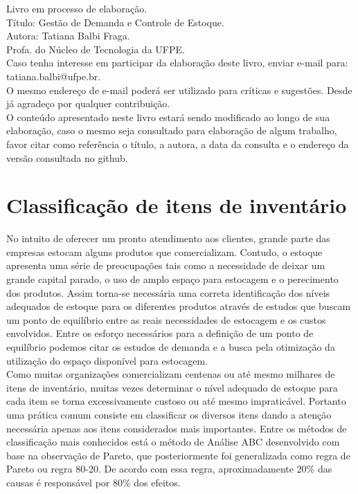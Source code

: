 \documentclass{book}
\begin{document}
Livro em processo de elaboração. \\

Título: Gestão de Demanda e Controle de Estoque.\\

Autora: Tatiana Balbi Fraga. \\

Profa. do Núcleo de Tecnologia da UFPE. \\

Caso tenha interesse em participar da elaboração deste livro, enviar e-mail para: tatiana.balbi@ufpe.br.\\

O mesmo endereço de e-mail poderá ser utilizado para críticas e sugestões. Desde já agradeço por qualquer contribuição. \\

O conteúdo apresentado neste livro estará sendo modificado ao longo de sua elaboração, caso o mesmo seja consultado para elaboração de algum trabalho, favor citar como referência o título, a autora, a data da consulta e o endereço da versão consultada no github. \\

\chapter{Classificação de itens de inventário}

No intuito de oferecer um pronto atendimento aos clientes, grande parte das empresas estocam alguns produtos que comercializam. Contudo, o estoque apresenta uma série de preocupações tais como a necessidade de deixar um grande capital parado, o uso de amplo espaço para estocagem e o perecimento dos produtos. Assim torna-se necessária uma correta identificação dos níveis adequados de estoque para os diferentes produtos através de estudos que buscam um ponto de equilíbrio entre as reais necessidades de estocagem e os custos envolvidos. Entre os esforço necessários para a definição de um ponto de equilíbrio podemos citar os estudos de demanda e a busca pela otimização da utilização do espaço disponível para estocagem. \\

Como muitas organizações comercializam centenas ou até mesmo milhares de itens de inventário, muitas vezes determinar o nível adequado de estoque para cada item se torna excessivamente custoso ou até mesmo impraticável. Portanto uma prática comum consiste em classificar os diversos itens dando a atenção necessária apenas aos itens considerados mais importantes. Entre os métodos de classificação mais conhecidos está o método de Análise ABC desenvolvido com base na observação de Pareto, que posteriormente foi generalizada como regra de Pareto ou regra 80-20. De acordo com essa regra, aproximadamente 20\% das causas é responsável por 80\% dos efeitos.   \\
\end{document}
